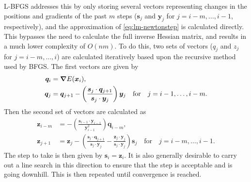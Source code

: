 L-BFGS addresses this by only storing several vectors representing changes in the positions and gradients of the past $m$ steps ($\bm{s}_j$ and $\bm{y}_j$ for $j=i-m,\ldots,i-1$, respectively), and the approximation of \cref{eq:lm-newtonstep} is calculated directly.
This bypasses the need to calculate the full inverse Hessian matrix, and results in a much lower complexity of $O(nm)$.
To do this, two sets of vectors ($q_j$ and $z_j$ for $j=i-m,\ldots,i$) are calculated iteratively based upon the recursive method used by BFGS.
The first vectors are given by
\begin{align}
  \bm{q}_i &= \bm{\nabla} E(\bm{x}_i),
  \label{eq:lm-lbfgs-q0}
  \\
  \bm{q}_j &= \bm{q}_{j+1} - \left( \frac{\bm{s}_j \cdot \bm{q}_{j+1}} {\bm{s}_j \cdot \bm{y}_j} \right) \bm{y}_j
    \quad \text{for} \quad j = i-1, \ldots, i-m.
  \label{eq:lm-lbfgs-q}
\end{align}
Then the second set of vectors are calculated as
\begin{align}
  \bm{z}_{i-m} &= - \left( \frac{\bm{s}_{i-1} \cdot \bm{y}_{i-1}} {\bm{y}_{i-1}^2} \right) \bm{q}_{i-m},
  \label{eq:lm-lbfgs-z0}
  \\
  \bm{z}_{j+1} &= \bm{z}_j - \left( \frac{\bm{s}_j \cdot \bm{q}_{j+1}} {\bm{s}_j \cdot \bm{y}_j} -
    \frac{\bm{z}_j \cdot \bm{y}_j} {\bm{s}_j \cdot \bm{y}_j} \right) \bm{s}_j
    \quad \text{for} \quad j = i-m, \ldots, i-1.
  \label{eq:lm-lbfgs-z}
\end{align}
The step to take is then given by $\bm{s}_i = \bm{z}_i$.
It is also generally desirable to carry out a line search in this direction to ensure that the step is acceptable and is going downhill.
This is then repeated until convergence is reached.


